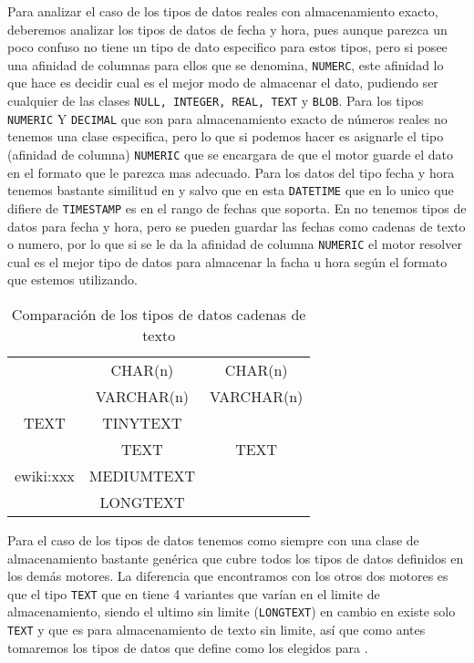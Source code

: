 Para analizar el caso de los tipos de datos reales con almacenamiento exacto, deberemos analizar los tipos de datos de fecha y hora, pues aunque parezca un poco confuso \s no tiene un tipo de dato especifico para estos tipos, pero si posee una afinidad de columnas para ellos que se denomina, \verb=NUMERC=, este afinidad lo que hace es decidir cual es el mejor modo de almacenar el dato, pudiendo ser cualquier de las clases \verb=NULL, INTEGER, REAL, TEXT= y \verb=BLOB=. Para los tipos \verb=NUMERIC= Y \verb=DECIMAL= que son para almacenamiento exacto de números reales no tenemos una clase especifica, pero lo que si podemos hacer es asignarle el tipo (afinidad de columna) \verb=NUMERIC= que se encargara de que el motor guarde el dato en el formato que le parezca mas adecuado. Para los datos del tipo fecha y hora tenemos bastante similitud  en \m y \p salvo que en \m esta \verb=DATETIME= que en lo unico que difiere de \verb=TIMESTAMP= es en el rango de fechas que soporta. En \s no tenemos tipos de datos para fecha y hora, pero se pueden guardar las fechas como cadenas de texto o numero, por lo que si se le da la afinidad de columna \verb=NUMERIC= el motor resolver cual es el mejor tipo de datos para almacenar la facha u hora según el formato que estemos utilizando.   

\begin{table}[h]
\begin{center}
\begin{tabular}{|c|c|c|}
\hline \s & \m & \p \\ 
\hline  & CHAR(n) & CHAR(n) \\  
    & VARCHAR(n) & VARCHAR(n) \\ 
  TEXT   & TINYTEXT &  \\  
    & TEXT & TEXT \\  e{wiki:xxx}
    & MEDIUMTEXT &  \\  
    & LONGTEXT &  \\  
\hline 
\end{tabular} 
\end{center}
\caption{Comparación de los tipos de datos cadenas de texto}
\end{table}

Para el caso de los tipos de datos tenemos como siempre \s con una clase de almacenamiento bastante genérica que cubre todos los tipos de datos definidos en los demás motores. La diferencia que encontramos con los otros dos motores es que el tipo \verb=TEXT= que en \m tiene 4 variantes que varían en el limite de almacenamiento, siendo el ultimo sin limite (\verb=LONGTEXT=) en cambio en \p existe solo \verb=TEXT= y que es para almacenamiento de texto sin limite, así que como antes tomaremos los tipos de datos que define \p como los elegidos para \cc. 

